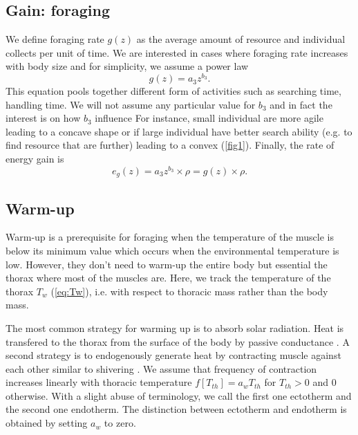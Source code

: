 \subsection*{Gain: foraging}
We define foraging rate $g(z)$ as the average amount of resource and individual collects per unit of time.
We are interested in cases where foraging rate increases with body size and for simplicity, we assume a power law 
\[
	g(z) = a_3 z^{b_3}.
\]
This equation pools together different form of activities such as searching time, handling time.
We will not assume any particular value for $b_3$ and in fact the interest is on how $b_3$ influence 
For instance, small individual are more agile leading to a concave shape or if large individual have better search ability (e.g. to find resource that are further) leading to a convex (\cref{fig1}). 
Finally, the rate of energy gain is  
\begin{equation} \label{eq:eg}
	e_g(z) = a_3 z^{b_3} \times \rho  = g(z) \times \rho.
\end{equation}

\subsection*{Warm-up}
Warm-up is a prerequisite for foraging when the temperature of the muscle is below its minimum value which occurs when the environmental temperature is low. 
However, they don't need to warm-up the entire body but essential the thorax where most of the muscles are. 
Here, we track the temperature of the thorax $T_w$ (\cref{eq:Tw}), i.e. with respect to thoracic mass rather than the body mass.

The most common strategy for warming up is to absorb solar radiation.
Heat is transfered to the thorax from the surface of the body by passive conductance \citep{Bakken1976}.
A second strategy is to endogenously generate heat by contracting muscle against each other similar to shivering \citep[e.g.,][]{Kammer1974}.
We assume that frequency of contraction increases linearly with thoracic temperature $f[T_{th}]  = a_w T_{th}$ for $T_{th}> 0$ and 0 otherwise.
With a slight abuse of terminology, we call the first one ectotherm and the second one endotherm. %
The distinction between ectotherm and endotherm is obtained by setting $a_w$ to zero.

